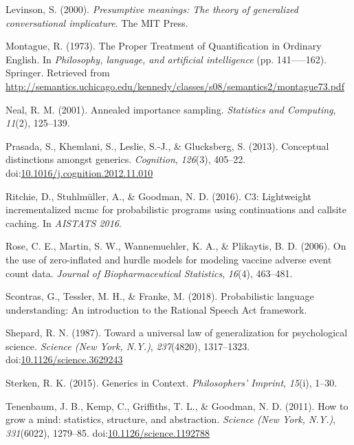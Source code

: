 \documentclass[floatsintext,doc]{apa6}
\begin{document}
\leavevmode\hypertarget{ref-Levinson2000}{}%
Levinson, S. (2000). \emph{Presumptive meanings: The theory of generalized conversational implicature}. The MIT Press.

\leavevmode\hypertarget{ref-Montague1973}{}%
Montague, R. (1973). The Proper Treatment of Quantification in Ordinary English. In \emph{Philosophy, language, and artificial intelligence} (pp. 141-----162). Springer. Retrieved from \url{http://semantics.uchicago.edu/kennedy/classes/s08/semantics2/montague73.pdf}

\leavevmode\hypertarget{ref-neal2001annealed}{}%
Neal, R. M. (2001). Annealed importance sampling. \emph{Statistics and Computing}, \emph{11}(2), 125--139.

\leavevmode\hypertarget{ref-Prasada2013}{}%
Prasada, S., Khemlani, S., Leslie, S.-J., \& Glucksberg, S. (2013). Conceptual distinctions amongst generics. \emph{Cognition}, \emph{126}(3), 405--22. doi:\href{https://doi.org/10.1016/j.cognition.2012.11.010}{10.1016/j.cognition.2012.11.010}

\leavevmode\hypertarget{ref-Ritchie2016}{}%
Ritchie, D., Stuhlmüller, A., \& Goodman, N. D. (2016). C3: Lightweight incrementalized mcmc for probabilistic programs using continuations and callsite caching. In \emph{AISTATS 2016}.

\leavevmode\hypertarget{ref-hurdleModels}{}%
Rose, C. E., Martin, S. W., Wannemuehler, K. A., \& Plikaytis, B. D. (2006). On the use of zero-inflated and hurdle models for modeling vaccine adverse event count data. \emph{Journal of Biopharmaceutical Statistics}, \emph{16}(4), 463--481.

\leavevmode\hypertarget{ref-problang}{}%
Scontras, G., Tessler, M. H., \& Franke, M. (2018). Probabilistic language understanding: An introduction to the Rational Speech Act framework.

\leavevmode\hypertarget{ref-Shepard1987}{}%
Shepard, R. N. (1987). Toward a universal law of generalization for psychological science. \emph{Science (New York, N.Y.)}, \emph{237}(4820), 1317--1323. doi:\href{https://doi.org/10.1126/science.3629243}{10.1126/science.3629243}

\leavevmode\hypertarget{ref-Sterken2015}{}%
Sterken, R. K. (2015). Generics in Context. \emph{Philosophers' Imprint}, \emph{15}(i), 1--30.

\leavevmode\hypertarget{ref-Tenenbaum2011}{}%
Tenenbaum, J. B., Kemp, C., Griffiths, T. L., \& Goodman, N. D. (2011). How to grow a mind: statistics, structure, and abstraction. \emph{Science (New York, N.Y.)}, \emph{331}(6022), 1279--85. doi:\href{https://doi.org/10.1126/science.1192788}{10.1126/science.1192788}
\end{document}
